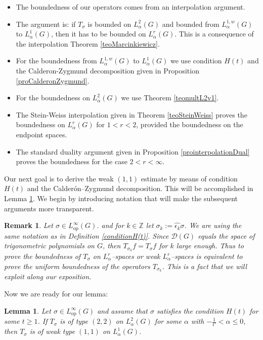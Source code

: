 \documentclass[12pt, reqno]{amsart}
\newtheorem{lema}[defi]{Lemma}
\newtheorem{rem}[defi]{Remark}
\newcommand{\1}{\mathds{1}}
\begin{document}
\begin{itemize}
    \item[(i)] The boundedness of our operators comes from an interpolation argument.
    \item[(ii)] The argument is: if $T_\sigma$ is bounded on $L^2_\alpha (G)$ and bounded from $L^{1,w}_\alpha (G)$ to $L^{1}_\alpha (G)$, then it has to be bounded on $L^r_\alpha (G)$. This is a consequence of the interpolation Theorem \ref{teoMarcinkiewicz}.   
    \item[(iii)] For the boundedness from $L^{1,w}_\alpha (G)$ to $L^{1}_\alpha (G)$ we use condition $H(t)$ and the Calderon-Zygmund decomposition given in Proposition \ref{proCalderonZygmund}.
    \item[(iv)] For the boundedness on $L^2_\alpha (G)$ we use Theorem \ref{teomultL2v1}. 
    \item[(v)]  The Stein-Weiss interpolation given in Theorem \ref{teoSteinWeiss} proves the boundedness on $L^r_\alpha (G)$ for $1<r<2$, provided the boundedness on the endpoint spaces. 
    \item[(vi)] The standard duality argument given in Proposition \ref{prointerpolationDual} proves the boundedness for the case $2<r<\infty$.    
\end{itemize}

Our next goal is to derive the weak $(1,1)$ estimate by means of condition $H(t)$ and the Calderón--Zygmund decomposition. This will be accomplished in Lemma \ref{lemaweak11}. We begin by introducing notation that will make the subsequent arguments more transparent.
\begin{rem}
    Let $\sigma\in L^{\infty}_{\mathrm{op}}(G)$.  and for $k\in\mathbb{Z}$ let $\sigma_{k}:=\widehat{\epsilon_k }\sigma$. We are using the same notation as in Definition \ref{conditionH(t)}.  Since $\mathcal{D}(G)$ equals the space of trigonometric polynomials on $G$, then $T_{\sigma_{k}}f=T_{\sigma}f$ for $k$ large enough. Thus to prove the boundedness of $T_{\sigma}$ on $L^{r}_{\alpha}$–spaces or weak $L^{r}_{\alpha}$–spaces is equivalent to prove the uniform boundedness of the operators $T_{\sigma_{k}}$. This is a fact that we will exploit along our exposition. 
\end{rem}
Now we are ready for our lemma: 

\begin{lema}\label{lemaweak11}
    Let $\sigma\in L^{\infty}_{\mathrm{op}}(G)$ and assume that $\sigma$ satisfies the condition $H(t)$ for some $t\geq 1$. If $T_{\sigma}$ is of type $(2,2)$ on $L^{2}_{\alpha}(G)$ for some $\alpha$ with $-\frac{1}{t'}<\alpha\leq 0$, then $T_{\sigma}$ is of weak type $(1,1)$ on $L^{1}_{\alpha}(G)$.
\end{lema}
\end{document}
